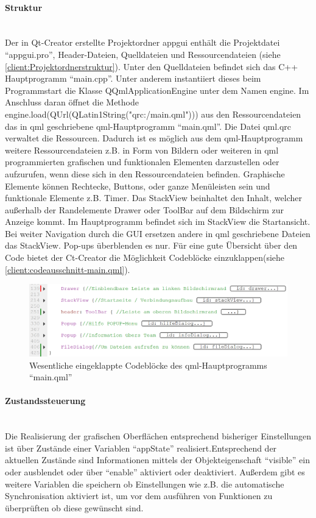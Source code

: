 \paragraph{Struktur}$\;$\\
Der in Qt-Creator erstellte Projektordner app\textunderscore gui enthält die Projektdatei "`app\textunderscore gui.pro"', Header-Dateien, Quelldateien und Ressourcendateien (siehe \autoref{client:Projektordnerstruktur}). Unter den Quelldateien befindet sich das C++ Hauptprogramm "`main.cpp"'. Unter anderem instantiiert dieses beim Programmstart die Klasse QQmlApplicationEngine unter dem Namen engine. Im Anschluss daran öffnet die Methode engine.load(QUrl(QLatin1String("qrc:/main.qml"))) aus den Ressourcendateien das in qml geschriebene qml-Hauptprogramm "`main.qml"'. Die Datei qml.qrc verwaltet die Ressourcen. Dadurch ist es möglich aus dem qml-Hauptprogramm weitere Ressourcendateien z.B. in Form von Bildern oder weiteren in qml programmierten grafischen und funktionalen Elementen darzustellen oder aufzurufen, wenn diese sich in den Ressourcendateien befinden. Graphische Elemente können Rechtecke, Buttons, oder ganze Menüleisten sein und funktionale Elemente z.B. Timer.
Das StackView beinhaltet den Inhalt, welcher außerhalb der Randelemente Drawer oder ToolBar auf dem Bildschirm zur Anzeige kommt. Im Hauptprogramm befindet sich im StackView die Startansicht. Bei weiter Navigation durch die GUI ersetzen andere in qml geschriebene Dateien das StackView. Pop-ups überblenden es nur.
Für eine gute Übersicht über den Code bietet der Ct-Creator die Möglichkeit Codebl\"ocke einzuklappen(siehe \autoref{client:codeausschnitt-main.qml}).

\begin{figure}[ht!]
	\centering
	\includegraphics[scale=0.8]{GUI/Bilder/qml-main-Codeausschnitt.PNG}
	\caption{Wesentliche eingeklappte Codebl\"ocke des qml-Hauptprogramms "`main.qml"' {\tiny}}
	\label{client:codeausschnitt-main.qml}
\end{figure}

\paragraph{Zustandssteuerung}$\;$\\
Die Realisierung der grafischen Oberflächen entsprechend bisheriger Einstellungen ist über Zustände einer Variablen "`appState"' realisiert.Entsprechend der aktuellen Zustände sind Informationen mittels der Objekteigenschaft "`visible"' ein oder ausblendet oder über "`enable"' aktiviert oder deaktiviert. Außerdem gibt es weitere Variablen die speichern ob Einstellungen wie z.B. die automatische Synchronisation aktiviert ist, um vor dem ausführen von Funktionen zu überprüften ob diese gewünscht sind.

